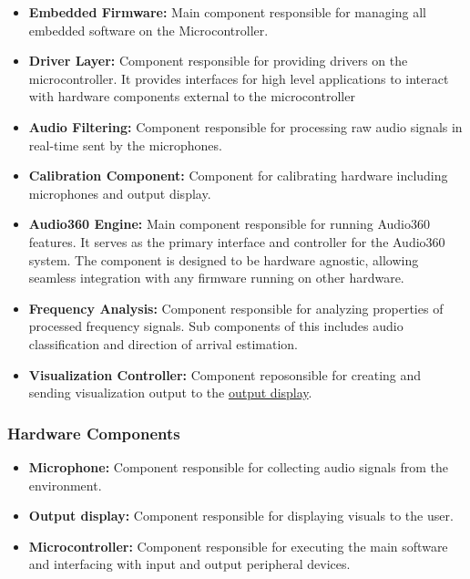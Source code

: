 \documentclass[12pt]{article}
\theoremstyle{definition}
\begin{document}
\begin{itemize}
  \item \textbf{Embedded Firmware:} \label{comp:embedded_firmware} Main
  component responsible for managing all embedded software on the
  Microcontroller.

  \item \textbf{Driver Layer:} \label{comp:driver_layer} Component responsible
  for providing drivers on the microcontroller. It provides interfaces for high
  level applications to interact with hardware components external to the
  microcontroller

  \item \textbf{Audio Filtering:} \label{comp:audio_filtering} Component
  responsible for processing raw audio signals in real-time sent by the
  microphones.

  \item \textbf{Calibration Component:} \label{comp:calibration} Component for
  calibrating hardware including microphones and output display.
  
  \item \textbf{Audio360 Engine:} \label{comp:audio360Engine} Main component
  responsible for running Audio360 features. It serves as the primary interface
  and controller for the Audio360 system. The component is designed to be
  hardware agnostic, allowing seamless integration with any firmware running on
  other hardware.
  
  \item \textbf{Frequency Analysis:} \label{comp:frequency_analysis} Component
  responsible for analyzing properties of processed frequency signals. Sub
  components of this includes audio classification and direction of arrival
  estimation.
  
  \item \textbf{Visualization Controller:} \label{comp:viz_controller} Component
  reposonsible for creating and sending visualization output to the
  \hyperref[comp:display]{output display}.
\end{itemize}

\subsubsection{Hardware Components}

\begin{itemize}
  \item \textbf{Microphone:}\label{comp:microphone} Component responsible for
  collecting audio signals from the environment.

  \item \textbf{Output display:}\label{comp:display} Component responsible for
  displaying visuals to the user.

  \item \textbf{Microcontroller:} \label{comp:microcontroller} Component
  responsible for executing the main software and interfacing with input and
  output peripheral devices.
\end{itemize}
\end{document}
